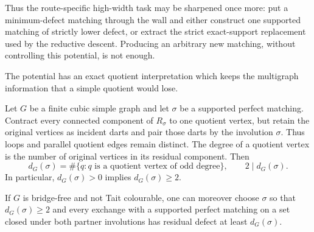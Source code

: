 Thus the route-specific high-width task may be sharpened once more: put a
minimum-defect matching through the wall and either construct one supported
matching of strictly lower defect, or extract the strict exact-support
replacement used by the reductive descent.  Producing an arbitrary new
matching, without controlling this potential, is not enough.

The potential has an exact quotient interpretation which keeps the
multigraph information that a simple quotient would lose.

\begin{theorem}
\label{thm:residual-defect-quotient-oddness}
Let \(G\) be a finite cubic simple graph and let \(\sigma\) be a supported
perfect matching.  Contract every connected component of \(R_\sigma\) to one
quotient vertex, but retain the original vertices as incident darts and pair
those darts by the involution \(\sigma\).  Thus loops and parallel quotient
edges remain distinct.  The degree of a quotient vertex is the number of
original vertices in its residual component.  Then
\[
 d_G(\sigma)
 =\#\{q:q\text{ is a quotient vertex of odd degree}\},
 \qquad 2\mid d_G(\sigma).
\]
In particular, \(d_G(\sigma)>0\) implies \(d_G(\sigma)\geq2\).

If \(G\) is bridge-free and not Tait colourable, one can moreover choose
\(\sigma\) so that \(d_G(\sigma)\geq2\) and every exchange with a supported
perfect matching on a set closed under both partner involutions has residual
defect at least \(d_G(\sigma)\).
\end{theorem}

